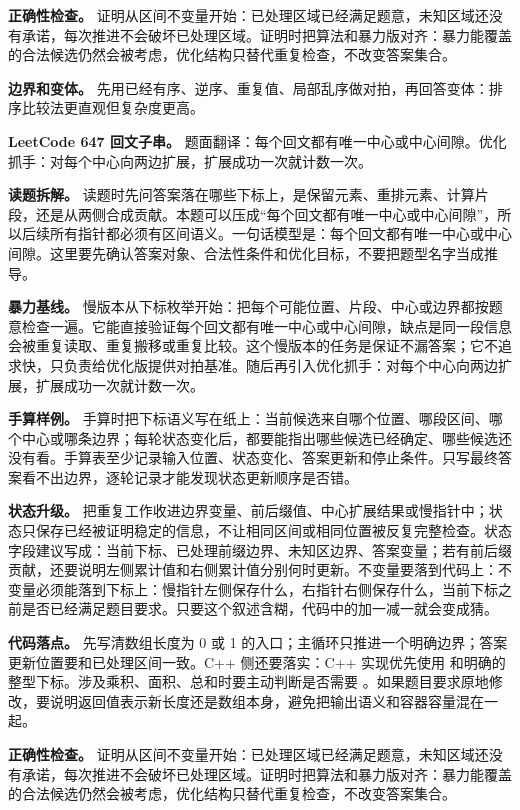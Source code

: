 \textbf{正确性检查。} 证明从区间不变量开始：已处理区域已经满足题意，未知区域还没有承诺，每次推进不会破坏已处理区域。证明时把算法和暴力版对齐：暴力能覆盖的合法候选仍然会被考虑，优化结构只替代重复检查，不改变答案集合。

\textbf{边界和变体。} 先用已经有序、逆序、重复值、局部乱序做对拍，再回答变体：排序比较法更直观但复杂度更高。

\noindent\textbf{LeetCode 647 回文子串。} 题面翻译：每个回文都有唯一中心或中心间隙。优化抓手：对每个中心向两边扩展，扩展成功一次就计数一次。

\textbf{读题拆解。} 读题时先问答案落在哪些下标上，是保留元素、重排元素、计算片段，还是从两侧合成贡献。本题可以压成“每个回文都有唯一中心或中心间隙”，所以后续所有指针都必须有区间语义。一句话模型是：每个回文都有唯一中心或中心间隙。这里要先确认答案对象、合法性条件和优化目标，不要把题型名字当成推导。

\textbf{暴力基线。} 慢版本从下标枚举开始：把每个可能位置、片段、中心或边界都按题意检查一遍。它能直接验证每个回文都有唯一中心或中心间隙，缺点是同一段信息会被重复读取、重复搬移或重复比较。这个慢版本的任务是保证不漏答案；它不追求快，只负责给优化版提供对拍基准。随后再引入优化抓手：对每个中心向两边扩展，扩展成功一次就计数一次。

\textbf{手算样例。} 手算时把下标语义写在纸上：当前候选来自哪个位置、哪段区间、哪个中心或哪条边界；每轮状态变化后，都要能指出哪些候选已经确定、哪些候选还没有看。手算表至少记录输入位置、状态变化、答案更新和停止条件。只写最终答案看不出边界，逐轮记录才能发现状态更新顺序是否错。

\textbf{状态升级。} 把重复工作收进边界变量、前后缀值、中心扩展结果或慢指针中；状态只保存已经被证明稳定的信息，不让相同区间或相同位置被反复完整检查。状态字段建议写成：当前下标、已处理前缀边界、未知区边界、答案变量；若有前后缀贡献，还要说明左侧累计值和右侧累计值分别何时更新。不变量要落到代码上：不变量必须能落到下标上：慢指针左侧保存什么，右指针右侧保存什么，当前下标之前是否已经满足题目要求。只要这个叙述含糊，代码中的加一减一就会变成猜。

\textbf{代码落点。} 先写清数组长度为 0 或 1 的入口；主循环只推进一个明确边界；答案更新位置要和已处理区间一致。C++ 侧还要落实：C++ 实现优先使用  和明确的整型下标。涉及乘积、面积、总和时要主动判断是否需要 。如果题目要求原地修改，要说明返回值表示新长度还是数组本身，避免把输出语义和容器容量混在一起。

\textbf{正确性检查。} 证明从区间不变量开始：已处理区域已经满足题意，未知区域还没有承诺，每次推进不会破坏已处理区域。证明时把算法和暴力版对齐：暴力能覆盖的合法候选仍然会被考虑，优化结构只替代重复检查，不改变答案集合。

